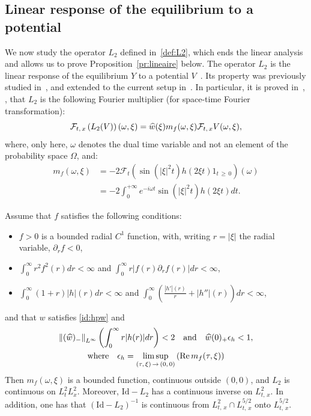 \documentclass[10pt]{amsart}
\theoremstyle{definition}\newtheorem{defi}[theo]{Definition}\newtheorem{rema}[theo]{Remark}\newtheorem{exam}[theo]{Example}\newtheorem{exem}[theo]{Example}\newtheorem{nota}[theo]{Notation}
\DeclareMathOperator{\Rel}{Re}
\newcommand{\Id}{\mathrm{Id}}
\newcommand{\mclF}{\mathcal{F}}
\let\oldhat\hat
\renewcommand*{\hat}[1]{\mathchoice{\widehat{#1}}{\widehat{#1}}{\oldhat{#1}}{\oldhat{#1}}}
\begin{document}
\subsection{Linear response of the equilibrium to a potential}

We now study the operator $L_2$ defined in~\eqref{def:L2}, which ends the linear analysis and allows us to prove Proposition~\ref{pr:lineaire} below. The operator $L_2$ is the linear response of the equilibrium $Y$ to a potential $V$~\cite{GV,L,Mih}. Its property was previously studied in~\cite{lewsab2}, and extended to the current setup in~\cite{CodS}. In particular, it is proved in~\cite[Proposition~1]{lewsab2}, \cite[Lemma~5.6]{CodS}, that $L_2$ is the following Fourier multiplier (for space-time Fourier transformation):
\[
\mclF_{t,\,x}\left(L_2(V)\right)(\omega,\xi) = \hat w (\xi)m_f(\omega,\xi) \mclF_{t,\,x} V(\omega,\xi),
\]
where, only here, $\omega$ denotes the dual time variable and not an element of the probability space $\Omega$, and:
\begin{equation} \label{def:mf}
\begin{split}
m_f(\omega,\xi) &= -2\mclF_t \left(\sin\left(|\xi|^2t\right) h(2\xi t)1_{t\,\geq\,0} \right)(\omega)\\
&=-2 \int_0^{+\infty} e^{-i\omega t} \sin \left(|\xi|^2t\right)h(2\xi t) dt.
\end{split}
\end{equation}

\pagebreak

\begin{prop} \label{pr:bdL2}
Assume that $f$ satisfies the following conditions:
\begin{itemize}
\item $f>0$ is a bounded radial $C^1$ function, with, writing $r= |\xi|$ the radial variable, $\partial_r f <0$,
\item $\int_0^\infty r^2f^2(r)dr<\infty$ and $\int_0^\infty r|f(r)\partial_r f(r)|dr < \infty$,
\item $\int_0^\infty (1+r)|h|(r)dr<\infty$ and $\int_0^\infty \left(\frac{|h'|(r)}{r}+|h''|(r)\right)dr<\infty$,
\end{itemize}
and that $w$ satisfies \eqref{id:hpw} and
\begin{multline}\label{def:eph}
\left\| (\hat w)_-\right\|_{L^{\infty}}\left(\int_{0}^{\infty} r|h(r)|dr\right)<2 \quad \text{and} \quad \hat w (0)_+\epsilon_h <1, \\
\text{where} \quad \epsilon_h= \limsup_{(\tau,\,\xi)\,\rightarrow\,(0,\,0)} \left(\Rel m_f(\tau,\xi)\right)
\end{multline}
Then $m_f(\omega,\xi)$ is a bounded function, continuous outside $(0,0)$, and $L_2$ is continuous on $L^2_tL^2_x$. Moreover, $\Id-L_2$ has a continuous inverse on $L^2_{t,\,x}$. In addition, one has that $(\Id-L_2)^{-1}$ is continuous from $L^2_{t,\,x}\cap L^{5/2}_{t,\,x}$ onto $L^{5/2}_{t,\,x}$.
\end{prop}
\end{document}
